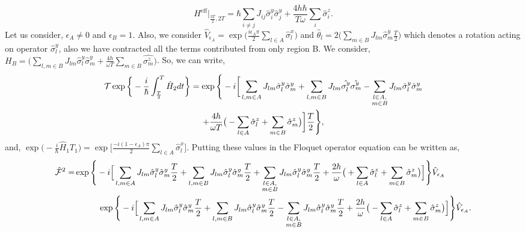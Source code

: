\documentclass[%
nofootinbib,
reprint,
superscriptaddress,
amsmath,amssymb,showkeys,
aps,
prb,
]{revtex4-2}
\begin{document}
	\begin{equation}
		H^{\mathrm{eff}}\vert_{\frac{3T}{2}, 2T} = \hbar\sum_{i\neq j} J_{ij} \hat{\sigma}^y_i \hat{\sigma}^y_{j} + \frac{4h\hbar}{T \omega}\sum_i\hat{\sigma}^z_i.
	\end{equation} 
	Let us consider, $\epsilon_A \neq 0$ and $\epsilon_B=1$. Also, we consider $\displaystyle \hat{V}_{\epsilon_A} = \exp\Big(\frac{i\epsilon_A \pi}{2}\sum_{l\in A}\hat{\sigma}^x_l\Big)$  and $\displaystyle \hat{\theta}_l = 2 \Big(\sum_{m \in B}J_{lm}\hat{\sigma}^y_m \frac{T}{2} \Big)$ which denotes a rotation acting on operator $\hat{\sigma}^y_l$, also we have contracted all the terms contributed from only region B. We consider, $\displaystyle {H}_B = \Big(\sum_{l,m\in B} J_{lm} \hat{\sigma}^y_l\hat{\sigma}^y_m + \frac{4h}{\omega T}\sum_{m \in B}\hat{\sigma^z_m}\Big)$. So, we can write,		
	\begin{multline}
		\mathcal{T}\exp\bigg\{-\frac{i}{\hbar}\int_{\frac{T}{2}}^{T} \hat{H}_2 dt\bigg\} = \exp\Bigg\{-i \bigg[ \sum_{l,m\in A}J_{lm} \hat{\sigma}_l^y\hat{\sigma}_m^y +\sum_{l,m\in B}J_{lm}
		\hat{\sigma_l^y}\hat{\sigma_m^y}-\sum_{\substack{%
				l \in A,\\
				m \in B\hfill}} J_{lm}\hat{\sigma}^y_l\hat{\sigma}^y_m\\+\frac{4h}{\omega T}\big( -\sum_{l\in A}^{}\hat{\sigma}^z_l + \sum_{m\in B}^{}\hat{\sigma}^z_m\big)\bigg]\frac{T}{2}\Bigg\},
	\end{multline}	
	and, $\displaystyle 
	\exp\Big(-\frac{i}{\hbar} \hat{H}_1 T_1\Big) = \exp\Bigg[\frac{-i(1-\epsilon_A)\pi}{2}\sum_{l \in A}\hat{\sigma}^x_l\Bigg].$
	Putting these values in the Floquet operator equation can be written as,    	
	\begin{align}
		\hat{\mathcal{F}}^2 
		=& \exp\Bigg\{-i \Big[ \sum_{l,m\in A}J_{lm} \hat{\sigma}^y_l\hat{\sigma}^y_m\frac{T}{2} +\sum_{l,m\in B}J_{lm} \hat{\sigma}^y_l\hat{\sigma}^y_m\frac{T}{2}+\sum_{\substack{%
				l \in A,\\
				m \in B\hfill}} J_{lm}\hat{\sigma}^y_l\hat{\sigma}^y_m\frac{T}{2} +\frac{2h}{\omega }\big( +\sum_{l\in A}^{}\hat{\sigma}^z_l + \sum_{m\in B}^{}\hat{\sigma}^z_m\big)\Big]\Bigg\} \hat{V}_{\epsilon_A} \nonumber\\
		& \hspace{1 cm}\exp\Bigg\{-i \Big[ \sum_{l,m\in A}J_{lm} \hat{\sigma}^y_l\hat{\sigma}^y_m\frac{T}{2} +\sum_{l,m\in B}J_{lm} \hat{\sigma}^y_l\hat{\sigma}^y_m\frac{T}{2}-\sum_{\substack{%
				l \in A,\\
				m \in B\hfill}} J_{lm}\hat{\sigma}^y_l\hat{\sigma}^y_m\frac{T}{2} +\frac{2h}{\omega}\big( -\sum_{l\in A}^{}\hat{\sigma}^z_l + \sum_{m\in B}^{}\hat{\sigma}^z_m\big)\Big]\Bigg\} \hat{V}_{\epsilon_A}.\nonumber
		\end{align}
\end{document}
